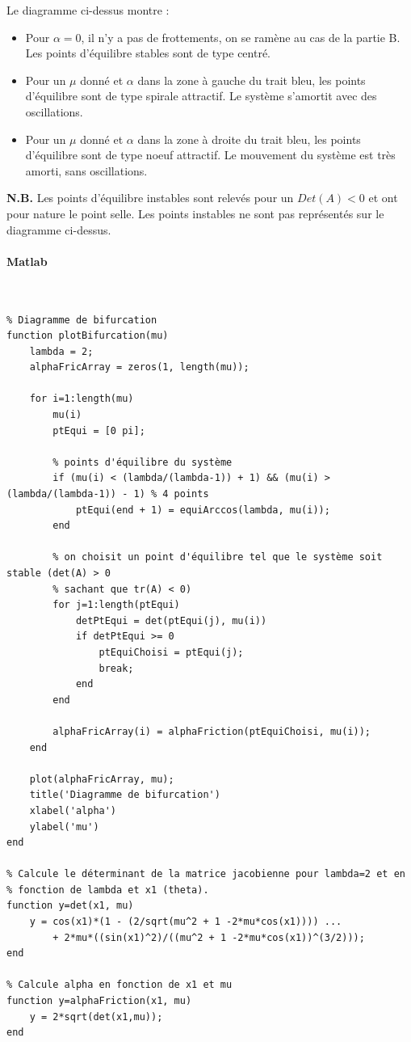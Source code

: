 \documentclass[11pt]{article}
\newlength{\leftbarwidth}
\newlength{\leftbarsep}
\newcommand*{\leftbarcolorcmd}{\color{leftbarcolor}} %
\renewenvironment{leftbar}{%
    \def\FrameCommand{{\leftbarcolorcmd{\vrule width \leftbarwidth\relax\hspace {\leftbarsep}}}}%
    \MakeFramed {\advance \hsize -\width \FrameRestore }%
}{%
    \endMakeFramed
}
\begin{document}
Le diagramme ci-dessus montre :
\begin{itemize}
	\item Pour $\alpha = 0$, il n'y a pas de frottements, on se ramène au cas de la partie B. Les points d'équilibre stables sont de type centré.
	\item Pour un $\mu$ donné et $\alpha$ dans la zone à gauche du trait bleu, les points d'équilibre sont de type spirale attractif. Le système s'amortit avec des oscillations.
	\item Pour un $\mu$ donné et $\alpha$ dans la zone à droite du trait bleu, les points d'équilibre sont de type noeuf attractif. Le mouvement du système est très amorti, sans oscillations.
\end{itemize}

\begin{leftbar}
	\textbf{N.B.} Les points d'équilibre instables sont relevés pour un $Det(A) < 0$ et ont pour nature le point selle. Les points instables ne sont pas représentés sur le diagramme ci-dessus.
\end{leftbar}

\newpage

\paragraph{Matlab}\mbox{}\\
\begin{lstlisting}
% Diagramme de bifurcation
function plotBifurcation(mu)
    lambda = 2;
    alphaFricArray = zeros(1, length(mu));

    for i=1:length(mu)
        mu(i)
        ptEqui = [0 pi];

        % points d'équilibre du système
        if (mu(i) < (lambda/(lambda-1)) + 1) && (mu(i) > (lambda/(lambda-1)) - 1) % 4 points
            ptEqui(end + 1) = equiArccos(lambda, mu(i));
        end

        % on choisit un point d'équilibre tel que le système soit stable (det(A) > 0
        % sachant que tr(A) < 0)
        for j=1:length(ptEqui)
            detPtEqui = det(ptEqui(j), mu(i))
            if detPtEqui >= 0
                ptEquiChoisi = ptEqui(j);
                break;
            end
        end

        alphaFricArray(i) = alphaFriction(ptEquiChoisi, mu(i));
    end

    plot(alphaFricArray, mu);
    title('Diagramme de bifurcation')
    xlabel('alpha')
    ylabel('mu')
end

% Calcule le déterminant de la matrice jacobienne pour lambda=2 et en
% fonction de lambda et x1 (theta).
function y=det(x1, mu)
    y = cos(x1)*(1 - (2/sqrt(mu^2 + 1 -2*mu*cos(x1)))) ...
        + 2*mu*((sin(x1)^2)/((mu^2 + 1 -2*mu*cos(x1))^(3/2)));
end

% Calcule alpha en fonction de x1 et mu
function y=alphaFriction(x1, mu)
    y = 2*sqrt(det(x1,mu));
end
\end{lstlisting}
\end{document}
